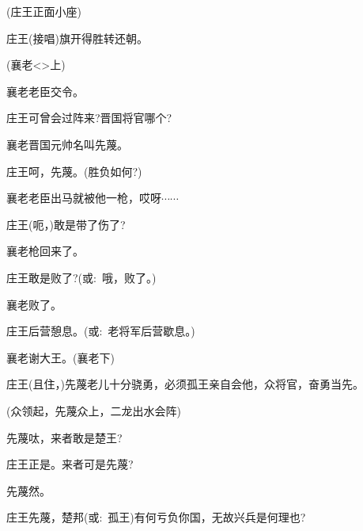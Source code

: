 {(庄王{\hwfs 正面小座})

庄王\hspace{30pt}({\akai 接唱})旗开得胜转还朝。

(襄老\textless{}\!\textgreater{}{\hwfs 上})


襄老\hspace{30pt}老臣交令。

庄王\hspace{30pt}可曾会过阵来?晋国将官哪个?

襄老\hspace{30pt}晋国元帅名叫先蔑。

庄王\hspace{30pt}呵，先蔑。(胜负如何?)

襄老\hspace{30pt}老臣出马就被他一枪，哎呀$\cdots{}\cdots{}$

庄王\hspace{30pt}(呃，)敢是带了伤了?

襄老\hspace{30pt}枪回来了。

庄王\hspace{30pt}敢是败了?({\akai 或}:~哦，败了。)

襄老\hspace{30pt}败了。

庄王\hspace{30pt}后营憩息。({\akai 或}:~老将军后营歇息。)

襄老\hspace{30pt}谢大王。(襄老{\hwfs 下})

庄王\hspace{30pt}(且住，)先蔑老儿十分骁勇，必须孤王亲自会他，众将官，奋勇当先。

(众{\hwfs 领起}，先蔑众{\hwfs 上}，{\hwfs 二龙出水会阵})

先蔑\hspace{30pt}呔，来者敢是楚王?

庄王\hspace{30pt}正是。来者可是先蔑?

先蔑\hspace{30pt}然。

庄王\hspace{30pt}先蔑，楚邦({\akai 或}:~孤王)有何亏负你国，无故兴兵是何理也?

}
